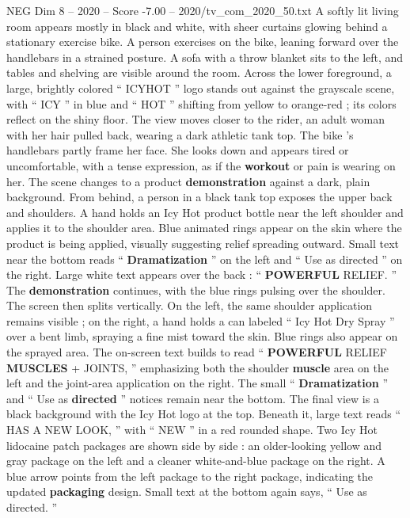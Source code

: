 \begin{textsample}{NEG Dim 8 – 2020 – Score -7.00 – 2020/tv\_com\_2020\_50.txt}  \label{ex:f8_neg_042}
A softly lit living room appears mostly in black and white, with sheer curtains glowing behind a stationary exercise bike.
A person exercises on the bike, leaning forward over the handlebars in a strained posture.
A sofa with a throw blanket sits to the left, and tables and shelving are visible around the room.
Across the lower foreground, a large, brightly colored “ ICYHOT ” logo stands out against the grayscale scene, with “ ICY ” in blue and “ HOT ” shifting from yellow to orange-red ; its colors reflect on the shiny floor.
The view moves closer to the rider, an adult woman with her hair pulled back, wearing a dark athletic tank top.
The bike ’s handlebars partly frame her face.
She looks down and appears tired or uncomfortable, with a tense expression, as if the \textbf{workout} or pain is wearing on her.
The scene changes to a product \textbf{demonstration} against a dark, plain background.
From behind, a person in a black tank top exposes the upper back and shoulders.
A hand holds an Icy Hot product bottle near the left shoulder and applies it to the shoulder area.
Blue animated rings appear on the skin where the product is being applied, visually suggesting relief spreading outward.
Small text near the bottom reads “ \textbf{Dramatization} ” on the left and “ Use as directed ” on the right.
Large white text appears over the back : “ \textbf{POWERFUL} RELIEF. ” The \textbf{demonstration} continues, with the blue rings pulsing over the shoulder.
The screen then splits vertically.
On the left, the same shoulder application remains visible ; on the right, a hand holds a can labeled “ Icy Hot Dry Spray ” over a bent limb, spraying a fine mist toward the skin.
Blue rings also appear on the sprayed area.
The on-screen text builds to read “ \textbf{POWERFUL} RELIEF \textbf{MUSCLES} + JOINTS, ” emphasizing both the shoulder \textbf{muscle} area on the left and the joint-area application on the right.
The small “ \textbf{Dramatization} ” and “ Use as \textbf{directed} ” notices remain near the bottom.
The final view is a black background with the Icy Hot logo at the top.
Beneath it, large text reads “ HAS A NEW LOOK, ” with “ NEW ” in a red rounded shape.
Two Icy Hot lidocaine patch packages are shown side by side : an older-looking yellow and gray package on the left and a cleaner white-and-blue package on the right.
A blue arrow points from the left package to the right package, indicating the updated \textbf{packaging} design.
Small text at the bottom again says, “ Use as directed. ”

\end{textsample}
